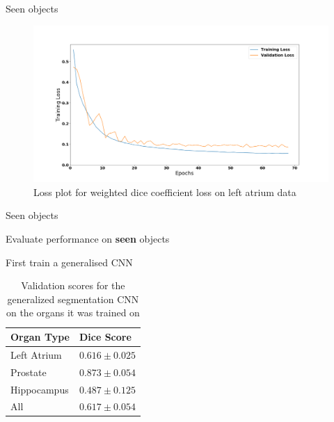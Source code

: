 \documentclass[10pt]{beamer}
\begin{document}
\begin{frame}[fragile]{Seen objects}

  \begin{figure}[h!]
    \centering
    \includegraphics[scale=0.23]{pictures/heartLoss}
    \caption{Loss plot for weighted dice coefficient loss on left atrium data 
    }
    \label{fig:spleenPlot}
  \end{figure}
  
 
\end{frame}

\begin{frame}[fragile]{Seen objects}

  Evaluate performance on \textbf{seen} objects

  First train a generalised CNN

  \begin{table}[h!]
    \centering
    \begin{tabular}{|l|l|}
      \hline
      Organ Type   & Dice Score         \\ \hline
      Left Atrium  & $0.616 \pm 0.025$ \\ 
      Prostate     & $0.873 \pm 0.054$ \\ 
      Hippocampus  & $0.487 \pm 0.125$ \\ \hline
      All          & $0.617 \pm 0.054$ \\ \hline
    \end{tabular}
    \caption{Validation scores for the generalized segmentation CNN on the organs it was trained on}
    \label{tab:resGen}
  \end{table}

  
\end{frame}
\end{document}
